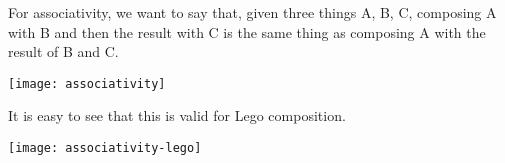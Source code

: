 \begin{center}
\end{center}


For associativity, we want to say that, given three things A, B, C, composing A with B and then the result with C is the same thing as composing A with the result of B and C.


\begin{center}
\texttt{[image: associativity]}
\end{center}
It is easy to see that this is valid for Lego composition.

\begin{center}
\texttt{[image: associativity-lego]}
\end{center}

